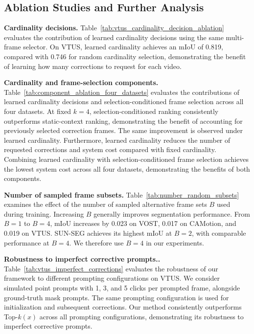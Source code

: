 
\subsection{Ablation Studies and Further Analysis}
\label{sec:ablation}

\noindent\textbf{Cardinality decisions.}
Table~\ref{tab:vtus_cardinality_decision_ablation} evaluates
the contribution of learned cardinality decisions using the
same multi-frame selector. On VTUS, learned cardinality
achieves an mIoU of 0.819, compared with 0.746 for random
cardinality selection, demonstrating the benefit of learning
how many corrections to request for each video.



\noindent\textbf{Cardinality and frame-selection components.}
Table~\ref{tab:component_ablation_four_datasets} evaluates the contributions
of learned cardinality decisions and selection-conditioned
frame selection across all four datasets.
At fixed $k=4$, selection-conditioned ranking consistently
outperforms static-context ranking, demonstrating the benefit
of accounting for previously selected correction frames.
The same improvement is observed under learned cardinality.
Furthermore, learned cardinality reduces the number of
requested corrections and system cost compared with fixed
cardinality. Combining learned cardinality with
selection-conditioned frame selection achieves the lowest
system cost across all four datasets, demonstrating the
benefits of both components.




\noindent\textbf{Number of sampled frame subsets.}
Table~\ref{tab:number_random_subsets} examines the effect of the number
of sampled alternative frame sets $B$ used during training.
Increasing $B$ generally improves segmentation performance.
From $B=1$ to $B=4$, mIoU increases by 0.023 on VOST,
0.017 on CAMotion, and 0.019 on VTUS.
SUN-SEG achieves its highest mIoU at $B=2$, with comparable
performance at $B=4$. We therefore use $B=4$ in our experiments.

\begin{table}[t]
    \centering
    
\end{table}


\noindent\textbf{Robustness to imperfect corrective prompts..}
Table~\ref{tab:vtus_imperfect_corrections} evaluates the robustness
of our framework to different prompting configurations on VTUS.
We consider simulated point prompts with 1, 3, and 5 clicks
per prompted frame, alongside ground-truth mask prompts.
The same prompting configuration is used for initialization
and subsequent corrections. Our method consistently
outperforms Top-$k(x)$ across all prompting configurations,
demonstrating its robustness to imperfect corrective prompts.



